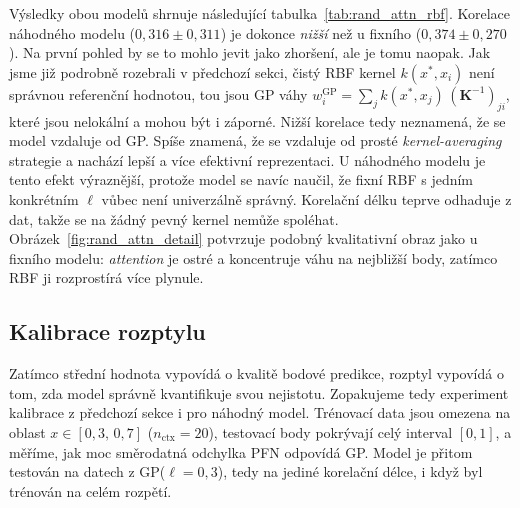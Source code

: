 Výsledky obou modelů shrnuje následující tabulka~\ref{tab:rand_attn_rbf}.
Korelace náhodného modelu ($0{,}316 \pm 0{,}311$) je dokonce \emph{nižší} než u fixního ($0{,}374 \pm 0{,}270$).
Na první pohled by se to mohlo jevit jako zhoršení, ale je tomu naopak.
Jak jsme již podrobně rozebrali v předchozí sekci, čistý RBF kernel $k(x^*, x_i)$ není správnou referenční hodnotou, tou jsou GP váhy $w_i^{\text{GP}} = \sum_j k(x^*, x_j)\,(\mathbf{K}^{-1})_{ji}$, které jsou nelokální a mohou být i záporné.
Nižší korelace tedy neznamená, že se model vzdaluje od GP.
Spíše znamená, že se vzdaluje od prosté \emph{kernel-averaging} strategie a nachází lepší a více efektivní reprezentaci.
U náhodného modelu je tento efekt výraznější, protože model se navíc naučil, že fixní RBF s jedním konkrétním $\ell$ vůbec není univerzálně správný.
Korelační délku teprve odhaduje z dat, takže se na žádný pevný kernel nemůže spoléhat.
Obrázek~\ref{fig:rand_attn_detail} potvrzuje podobný kvalitativní obraz jako u fixního modelu: \emph{attention} je ostré a koncentruje váhu na nejbližší body, zatímco RBF ji rozprostírá více plynule.

\subsection{Kalibrace rozptylu}
\label{subsec:kalibrace-variance-random}

Zatímco střední hodnota vypovídá o kvalitě bodové predikce, rozptyl vypovídá o tom, zda model správně kvantifikuje svou nejistotu.
Zopakujeme tedy experiment kalibrace z předchozí sekce i pro náhodný model.
Trénovací data jsou omezena na oblast $x \in [0{,}3,\, 0{,}7]$ ($n_{\text{ctx}} = 20$), testovací body pokrývají celý interval $[0, 1]$, a měříme, jak moc směrodatná odchylka PFN odpovídá GP.
Model je přitom testován na datech z GP($\ell = 0{,}3$), tedy na jediné korelační délce, i když byl trénován na celém rozpětí.
\par

